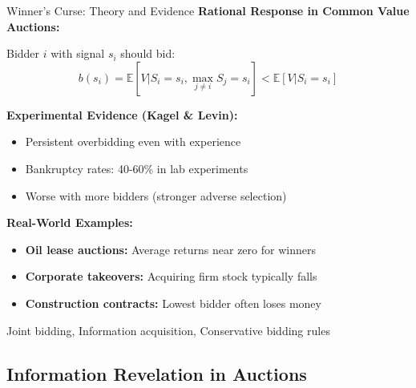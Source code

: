 \documentclass[xcolor={x11names}]{beamer}
\newcommand{\E}{\mathbb{E}}
\begin{document}
\begin{frame}{Winner's Curse: Theory and Evidence}
\textbf{Rational Response in Common Value Auctions:}

Bidder $i$ with signal $s_i$ should bid:
$$b(s_i) = \E[V | S_i = s_i, \max_{j \neq i} S_j = s_i] < \E[V | S_i = s_i]$$


\textbf{Experimental Evidence (Kagel \& Levin):}
\begin{itemize}
  \item Persistent overbidding even with experience
  \item Bankruptcy rates: 40-60\% in lab experiments
  \item Worse with more bidders (stronger adverse selection)
\end{itemize}


\textbf{Real-World Examples:}
\begin{itemize}
  \item \textbf{Oil lease auctions:} Average returns near zero for winners
  \item \textbf{Corporate takeovers:} Acquiring firm stock typically falls
  \item \textbf{Construction contracts:} Lowest bidder often loses money
\end{itemize}

\begin{tcolorbox}[colback=red!5!white,colframe=red!75!black,title=Mitigation Strategies]
Joint bidding, Information acquisition, Conservative bidding rules
\end{tcolorbox}
\end{frame}

\subsection{Information Revelation in Auctions}
\end{document}
